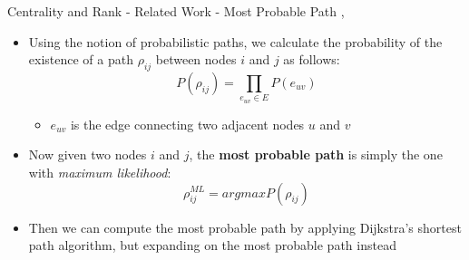 \documentclass[9pt]{beamer}
\begin{document}


\begin{frame}{Centrality and Rank - Related Work - Most Probable Path \cite{pfeiffer2010probabilistic}, \cite{pfeiffer2011methods}}
\begin{itemize}
\item Using the notion of probabilistic paths, we calculate the probability of the existence of a path $\rho_{ij}$ between nodes $i$ and $j$ as follows:
\begin{equation*}
P(\rho_{ij}) = \prod_{e_{uv} \in E}P(e_{uv})
\end{equation*}
\vspace{-0.12in}
\begin{itemize}
\item $e_{uv}$ is the edge connecting two adjacent nodes $u$ and $v$
\end{itemize}
\item Now given two nodes $i$ and $j$, the \textbf{most probable path} is simply the one with \textit{maximum likelihood}:
\[ \rho_{ij}^{ML} = argmaxP(\rho_{ij}) \]
\item Then we can compute the most probable path by applying Dijkstra's shortest path algorithm, but expanding on the most probable path instead
\end{itemize}
\end{frame}


\end{document}
